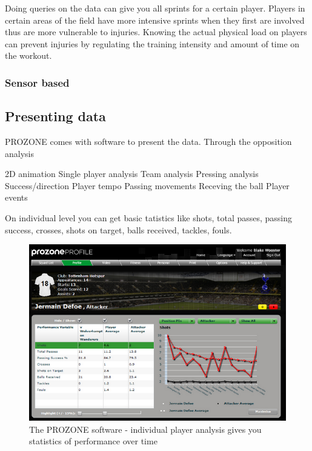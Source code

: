 Doing queries on the data can give you all sprints for a certain player. Players in certain areas of the field have more intensive sprints when they first are involved thus are more vulnerable to injuries. Knowing the actual physical load on players can prevent injuries by regulating the training intensity and amount of time on the workout. 

\subsubsection{Sensor based}


\subsection{Presenting data}

PROZONE comes with software to present the data. Through the opposition analysis

2D animation
Single player analysis
Team analysis
Pressing analysis
Success/direction
Player tempo
Passing movements
Receving the ball
Player events

On individual level you can get basic tatistics like shots, total passes, passing success, crosses, shots on target, balls received, tackles, fouls. 

\cite{dailymailOnStatistics}

\begin{figure}[ht!]
\centering
\includegraphics[width=150mm]{images/general/prozonestats.png}
\caption{The PROZONE software - individual player analysis gives you statistics of performance over time}
\label{overflow}
\end{figure}



